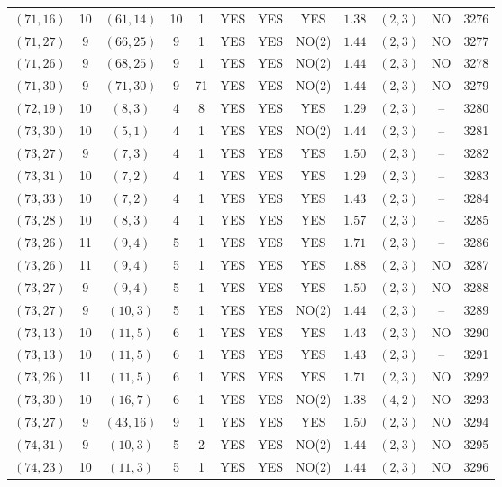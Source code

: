 \begin{longtable}{|c|c|c|c|c|c|c|c|c|c|c|c|}
$(71,16)$ & 10 & $(61,14)$ & 10 & 1 & YES & YES & YES & $1.38$ & $(2,3)$ & NO & 3276\\
$(71,27)$ & 9 & $(66,25)$ & 9 & 1 & YES & YES & NO(2) & $1.44$ & $(2,3)$ & NO & 3277\\
$(71,26)$ & 9 & $(68,25)$ & 9 & 1 & YES & YES & NO(2) & $1.44$ & $(2,3)$ & NO & 3278\\
$(71,30)$ & 9 & $(71,30)$ & 9 & 71 & YES & YES & NO(2) & $1.44$ & $(2,3)$ & NO & 3279\\
$(72,19)$ & 10 & $(8,3)$ & 4 & 8 & YES & YES & YES & $1.29$ & $(2,3)$ & -- & 3280\\
$(73,30)$ & 10 & $(5,1)$ & 4 & 1 & YES & YES & NO(2) & $1.44$ & $(2,3)$ & -- & 3281\\
$(73,27)$ & 9 & $(7,3)$ & 4 & 1 & YES & YES & YES & $1.50$ & $(2,3)$ & -- & 3282\\
$(73,31)$ & 10 & $(7,2)$ & 4 & 1 & YES & YES & YES & $1.29$ & $(2,3)$ & -- & 3283\\
$(73,33)$ & 10 & $(7,2)$ & 4 & 1 & YES & YES & YES & $1.43$ & $(2,3)$ & -- & 3284\\
$(73,28)$ & 10 & $(8,3)$ & 4 & 1 & YES & YES & YES & $1.57$ & $(2,3)$ & -- & 3285\\
$(73,26)$ & 11 & $(9,4)$ & 5 & 1 & YES & YES & YES & $1.71$ & $(2,3)$ & -- & 3286\\
$(73,26)$ & 11 & $(9,4)$ & 5 & 1 & YES & YES & YES & $1.88$ & $(2,3)$ & NO & 3287\\
$(73,27)$ & 9 & $(9,4)$ & 5 & 1 & YES & YES & YES & $1.50$ & $(2,3)$ & NO & 3288\\
$(73,27)$ & 9 & $(10,3)$ & 5 & 1 & YES & YES & NO(2) & $1.44$ & $(2,3)$ & -- & 3289\\
$(73,13)$ & 10 & $(11,5)$ & 6 & 1 & YES & YES & YES & $1.43$ & $(2,3)$ & NO & 3290\\
$(73,13)$ & 10 & $(11,5)$ & 6 & 1 & YES & YES & YES & $1.43$ & $(2,3)$ & -- & 3291\\
$(73,26)$ & 11 & $(11,5)$ & 6 & 1 & YES & YES & YES & $1.71$ & $(2,3)$ & NO & 3292\\
$(73,30)$ & 10 & $(16,7)$ & 6 & 1 & YES & YES & NO(2) & $1.38$ & $(4,2)$ & NO & 3293\\
$(73,27)$ & 9 & $(43,16)$ & 9 & 1 & YES & YES & YES & $1.50$ & $(2,3)$ & NO & 3294\\
$(74,31)$ & 9 & $(10,3)$ & 5 & 2 & YES & YES & NO(2) & $1.44$ & $(2,3)$ & NO & 3295\\
$(74,23)$ & 10 & $(11,3)$ & 5 & 1 & YES & YES & NO(2) & $1.44$ & $(2,3)$ & NO & 3296\\

\end{longtable}
